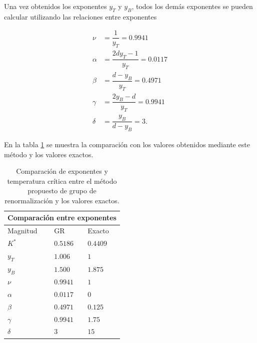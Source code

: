 \documentclass[10pt]{article}
\begin{document}
Una vez obtenidos los exponentes $y_T$ y $y_B$, todos los dem\'as exponentes se pueden calcular utilizando las relaciones entre exponentes

\begin{align}
\nu &= \dfrac{1}{y_T} =0.9941\\
\alpha &= \dfrac{2d y_T - 1}{y_T} = 0.0117 \\
\beta &= \dfrac{d-y_B}{y_T} = 0.4971 \\
\gamma &= \dfrac{2 y_B - d}{y_T} = 0.9941 \\
\delta &= \dfrac{y_B}{d-y_B} = 3.
\end{align}

En la tabla \ref{tabla} se muestra la comparaci\'on con los valores obtenidos mediante este m\'etodo y los valores exactos.

\begin{table}
\centering
\begin{tabular}{ |p{2cm}||p{2cm}|p{2cm}|  }
 \hline
 \multicolumn{3}{|c|}{Comparaci\'on entre exponentes} \\
 \hline
 Magnitud& GR &Exacto\\
 \hline
 $K^*$    & $0.5186$  & $0.4409$\\
 $y_T$    & $1.006$  & $1$\\
 $y_B$    & $1.500$  & $1.875$\\
 $\nu$    & $0.9941$ & $1$\\
 $\alpha$ & $0.0117$ & $0$\\
 $\beta$  & $0.4971$ & $0.125$\\
 $\gamma$ & $0.9941$ & $1.75$   \\
 $\delta$ & $3$      & $15$\\
 \hline
\end{tabular}
\caption{\label{tabla} Comparaci\'on de exponentes y temperatura cr\'itica entre el m\'etodo propuesto de grupo de renormalizaci\'on y los valores exactos.}
\end{table}
\end{document}
